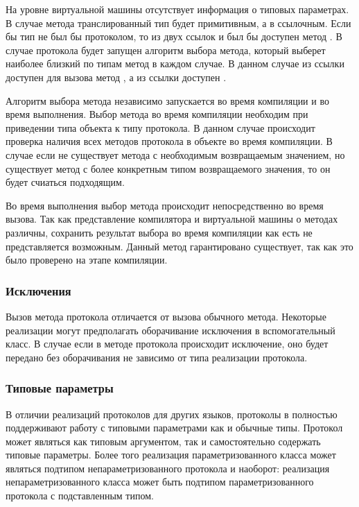 На уровне виртуальной машины отсутствует информация о типовых параметрах. В случае метода  транслированный тип будет примитивным, а в  ссылочным. Если бы тип  не был бы протоколом, то из двух ссылок  и  был бы доступен метод . В случае протокола будет запущен алгоритм выбора метода, который выберет наиболее близкий по типам метод в каждом случае. В данном случае из ссылки  доступен для вызова метод , а из ссылки  доступен .

Алгоритм выбора метода независимо запускается во время компиляции и во время выполнения. Выбор метода во время компиляции необходим при приведении типа объекта к типу протокола. В данном случае происходит проверка наличия всех методов протокола в объекте во время компиляции. В случае если не существует метода с необходимым возвращаемым значением, но существует метод с более конкретным типом возвращаемого значения, то он будет счиаться подходящим.

Во время выполнения выбор метода происходит непосредственно во время вызова. Так как представление компилятора и виртуальной машины о методах различны, сохранить результат выбора во время компиляции как есть не представляется возможным. Данный метод гарантировано существует, так как это было проверено на этапе компиляции.

\subsubsection{Исключения}
Вызов метода протокола отличается от вызова обычного метода. Некоторые реализации могут предполагать оборачивание исключения в вспомогательный класс. В случае если в методе протокола происходит исключение, оно будет передано без оборачивания не зависимо от типа реализации протокола.

\subsubsection{Типовые параметры}
В отличии реализаций протоколов для других  языков, протоколы в  полностью поддерживают работу с типовыми параметрами как и обычные типы. Протокол может являться как типовым аргументом, так и самостоятельно содержать типовые параметры. Более того реализация параметризованного класса может являться подтипом непараметризованного протокола и наоборот: реализация непараметризованного класса может быть подтипом параметризованного протокола с подставленным типом.


